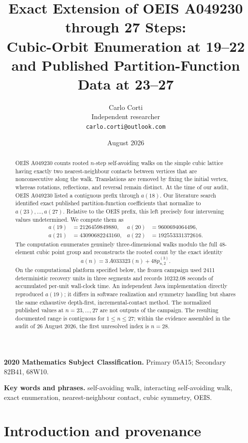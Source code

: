\documentclass[11pt]{article}
\title{Exact Extension of OEIS A049230 through 27 Steps:\\
Cubic-Orbit Enumeration at 19--22 and Published Partition-Function Data at 23--27}
\author{Carlo Corti\\
Independent researcher\\
\texttt{carlo.corti@outlook.com}}
\date{August 2026}
\theoremstyle{definition}
\theoremstyle{remark}
\begin{document}
\maketitle

\begin{abstract}
OEIS A049230 counts rooted $n$-step self-avoiding walks on the simple cubic
lattice having exactly two nearest-neighbour contacts between vertices that
are nonconsecutive along the walk.
Translations are removed by fixing the initial vertex, whereas rotations,
reflections, and reversal remain distinct.  At the time of our audit, OEIS
A049230 listed a contiguous prefix through $a(18)$.  Our literature search
identified exact published partition-function coefficients that normalize to
$a(23),\ldots,a(27)$.  Relative to the OEIS prefix, this left precisely four
intervening values undetermined.  We compute them as
\[
\begin{aligned}
a(19)&=2126459849880,&
a(20)&=9600694064496,\\
a(21)&=43090682243160,&
a(22)&=192553331372616.
\end{aligned}
\]
The computation enumerates genuinely three-dimensional walks modulo the full
48-element cubic point group and reconstructs the rooted count by the exact
identity
\[
 a(n)=3\,A033323(n)+48p_{n,2}^{(3)}.
\]
On the computational platform specified below, the frozen campaign used 2411
deterministic recovery units in three segments and records 10232.08 seconds of
accumulated per-unit wall-clock time.  An
independent Java implementation directly reproduced $a(19)$; it differs in
software realization and symmetry handling but shares the same exhaustive
depth-first, incremental-contact method.  The normalized published values at
$n=23,\ldots,27$ are not outputs of the campaign.  The resulting documented
range is contiguous for $1\leq n\leq27$; within the evidence assembled in the
audit of 26 August 2026, the first unresolved index is $n=28$.
\end{abstract}

\noindent\textbf{2020 Mathematics Subject Classification.}
Primary 05A15; Secondary 82B41, 68W10.

\noindent\textbf{Key words and phrases.}
self-avoiding walk, interacting self-avoiding walk, exact enumeration,
nearest-neighbour contact, cubic symmetry, OEIS.

\section{Introduction and provenance}
\end{document}
